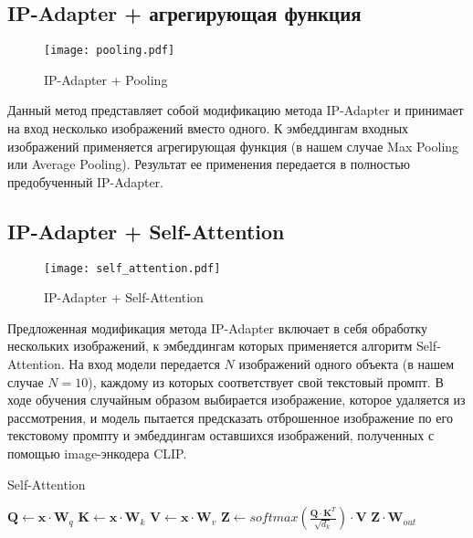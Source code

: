 \documentclass{article}
\begin{document}
\subsection{IP-Adapter + агрегирующая функция}
\vspace{-45pt}
\begin{figure}[H]
    \centering
    \texttt{[image: pooling.pdf]}
    \caption{IP-Adapter + Pooling}
    \label{fig:pooling}
\end{figure}

Данный метод представляет собой модификацию метода IP-Adapter и принимает на вход несколько изображений вместо одного. К эмбеддингам входных изображений применяется агрегирующая функция (в нашем случае Max Pooling или Average Pooling). Результат ее применения передается в полностью предобученный IP-Adapter.

\subsection{IP-Adapter + Self-Attention}
\vspace{-20pt}
\begin{figure}[h]
    \centering
    \texttt{[image: self\_attention.pdf]}
    \caption{IP-Adapter + Self-Attention}
    \label{fig:self_attention}
\end{figure}

Предложенная модификация метода IP-Adapter включает в себя обработку нескольких изображений, к эмбеддингам которых применяется алгоритм Self-Attention\cite{4}. На вход модели передается $N$ изображений одного объекта (в нашем случае $N = 10$), каждому из которых соответствует свой текстовый промпт. В ходе обучения случайным образом выбирается изображение, которое удаляется из рассмотрения, и модель пытается предсказать отброшенное изображение по его текстовому промпту и эмбеддингам оставшихся изображений, полученных с помощью image-энкодера CLIP.

\begin{algorithm}
\caption{Self-Attention}
\label{self_attention}
\begin{algorithmic}
    \State $\mathbf{Q} \gets \mathbf{x} \cdot \mathbf{W}_{q}$
    \State $\mathbf{K} \gets \mathbf{x} \cdot \mathbf{W}_{k}$
    \State $\mathbf{V} \gets \mathbf{x} \cdot \mathbf{W}_{v}$
    \State $\mathbf{Z} \gets \text{$softmax$}\left(\frac{\mathbf{Q} \cdot \mathbf{K}^T}{\sqrt{d_k}}\right) \cdot \mathbf{V}$
    \State \Return $\mathbf{Z} \cdot \mathbf{W}_{out}$
\EndProcedure
\end{algorithmic}
\end{algorithm}
\end{document}
